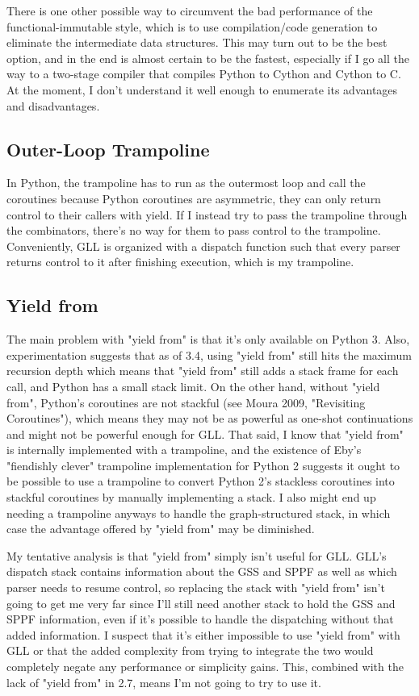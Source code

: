 \documentclass[12pt]{article}
\begin{document}
There is one other possible way to circumvent the bad performance of
the functional-immutable style, which is to use compilation/code
generation to eliminate the intermediate data structures.  This may
turn out to be the best option, and in the end is almost certain to be
the fastest, especially if I go all the way to a two-stage compiler
that compiles Python to Cython and Cython to C.  At the moment, I
don't understand it well enough to enumerate its advantages and
disadvantages.


\subsection{Outer-Loop Trampoline}
\label{sec:trampoline}

In Python, the trampoline has to run as the outermost loop and call
the coroutines because Python coroutines are asymmetric, they can only
return control to their callers with yield.  If I instead try to pass
the trampoline through the combinators, there's no way for them to
pass control to the trampoline.  Conveniently, GLL is organized with a
dispatch function such that every parser returns control to it after
finishing execution, which is my trampoline.


\subsection{Yield from}
\label{sec:yield_from}

The main problem with "yield from" is that it's only available on
Python 3.  Also, experimentation suggests that as of 3.4, using "yield
from" still hits the maximum recursion depth which means that "yield
from" still adds a stack frame for each call, and Python has a small
stack limit.  On the other hand, without "yield from", Python's
coroutines are not stackful (see Moura 2009, "Revisiting Coroutines"),
which means they may not be as powerful as one-shot continuations and
might not be powerful enough for GLL.  That said, I know that "yield
from" is internally implemented with a trampoline, and the existence
of Eby's "fiendishly clever" trampoline implementation for Python 2
suggests it ought to be possible to use a trampoline to convert Python
2's stackless coroutines into stackful coroutines by manually
implementing a stack.  I also might end up needing a trampoline
anyways to handle the graph-structured stack, in which case the
advantage offered by "yield from" may be diminished.

My tentative analysis is that "yield from" simply isn't useful for
GLL.  GLL's dispatch stack contains information about the GSS and SPPF
as well as which parser needs to resume control, so replacing the
stack with "yield from" isn't going to get me very far since I'll
still need another stack to hold the GSS and SPPF information, even if
it's possible to handle the dispatching without that added
information.  I suspect that it's either impossible to use "yield
from" with GLL or that the added complexity from trying to integrate
the two would completely negate any performance or simplicity gains.
This, combined with the lack of "yield from" in 2.7, means I'm not
going to try to use it.
\end{document}

